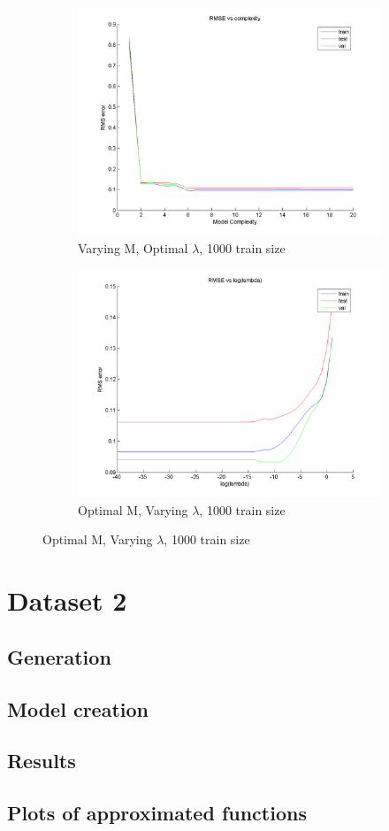 \documentclass{article}
\begin{document}
\begin{figure}[H]
\begin{subfigure}{.5\textwidth}
\centering
\includegraphics[width=\linewidth]{RMS_complexity_1000}
\caption{Varying M, Optimal $\lambda$, 1000 train size}
\end{subfigure}
\begin{subfigure}{.5\textwidth}
\includegraphics[width=\linewidth]{RMS_lambda_1000}
\caption{Optimal M, Varying $\lambda$, 1000 train size}
\end{subfigure}



\end{figure}



\section{Dataset 2}

\subsection{Generation}

\subsection{Model creation}
\subsection{Results}

\subsection{Plots of approximated functions}
\end{document}
